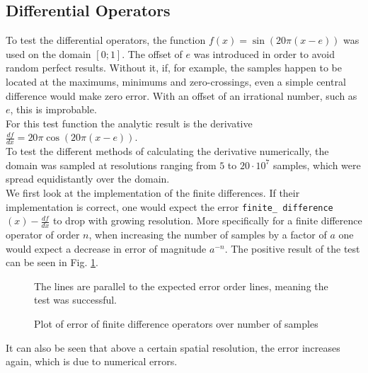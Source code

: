 \subsection{Differential Operators}\label{sec:numeric_diff_ops}
To test the differential operators, the function $f(x)=\sin(20\pi (x-e))$ was used on the domain $[0;1]$.
The offset of $e$ was introduced in order to avoid random perfect results.
Without it, if, for example, the samples happen to be located at the maximums, minimums and zero-crossings, even a simple central difference would make zero error.
With an offset of an irrational number, such as $e$, this is improbable.\\
For this test function the analytic result is the derivative $\frac{df}{dx}=20\pi\cos(20\pi (x-e))$.\\
To test the different methods of calculating the derivative numerically, the domain was sampled at resolutions ranging from $5$ to $20\cdot 10^7$ samples, which were spread equidistantly over the domain.\\
We first look at the implementation of the finite differences.
If their implementation is correct, one would expect the error \texttt{finite\_ difference} $(x)-\frac{df}{dx}$ to drop with growing resolution.
More specifically for a finite difference operator of order $n$, when increasing the number of samples by a factor of $a$ one would expect a decrease in error of magnitude $a^{-n}$.
The positive result of the test can be seen in Fig. \ref{fig:derivative_error}.
\begin{figure}[!h]
    \caption{Plot of error of finite difference operators over number of samples}
    \label{fig:derivative_error}
    \small
    The lines are parallel to the expected error order lines, meaning the test was successful.
\end{figure}
It can also be seen that above a certain spatial resolution, the error increases again, which is due to numerical errors.
